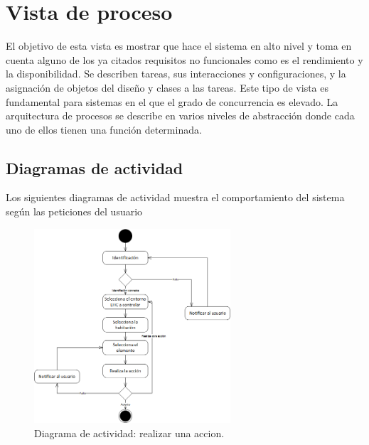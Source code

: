 \chapter{Vista de proceso}
El objetivo de esta vista es mostrar que hace el sistema en alto nivel y toma en cuenta alguno de los ya citados requisitos no funcionales como es el rendimiento y la disponibilidad. Se describen tareas, sus interacciones y configuraciones, y la asignaci\'on de objetos del dise\~no y clases a las tareas. 
Este tipo de vista es fundamental para sistemas en el que el grado de concurrencia es elevado.
La arquitectura de procesos se describe en varios niveles de abstracci\'on donde cada uno de ellos tienen una funci\'on determinada.

\section{Diagramas de actividad}

Los siguientes diagramas de actividad muestra el comportamiento del sistema según las peticiones del usuario

\begin{figure}
	\centering
	\includegraphics[width=0.65\textwidth]{4.Disenio/Imagenes/ACT-Accion}
	\caption{Diagrama de actividad: realizar una accion.}
	\label{fig:diagramaAccion}
\end{figure}


